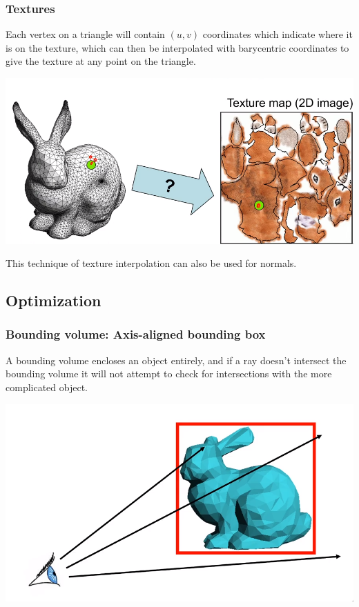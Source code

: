 \documentclass[12pt]{article}
\begin{document}
\subsubsection{Textures}

Each vertex on a triangle will contain $(u,v)$ coordinates which
indicate where it is on the texture, which can then be interpolated
with barycentric coordinates to give the texture at any point on the
triangle.

\includegraphics[scale=.5]{images/texture-map.png}

This technique of texture interpolation can also be used for normals.

\subsection{Optimization}

\subsubsection{Bounding volume: Axis-aligned bounding box}

A bounding volume encloses an object entirely, and if a ray
doesn't intersect the bounding volume it will not attempt to
check for intersections with the more complicated object.

\includegraphics[scale=2]{images/bounding-volume.png}
\end{document}
